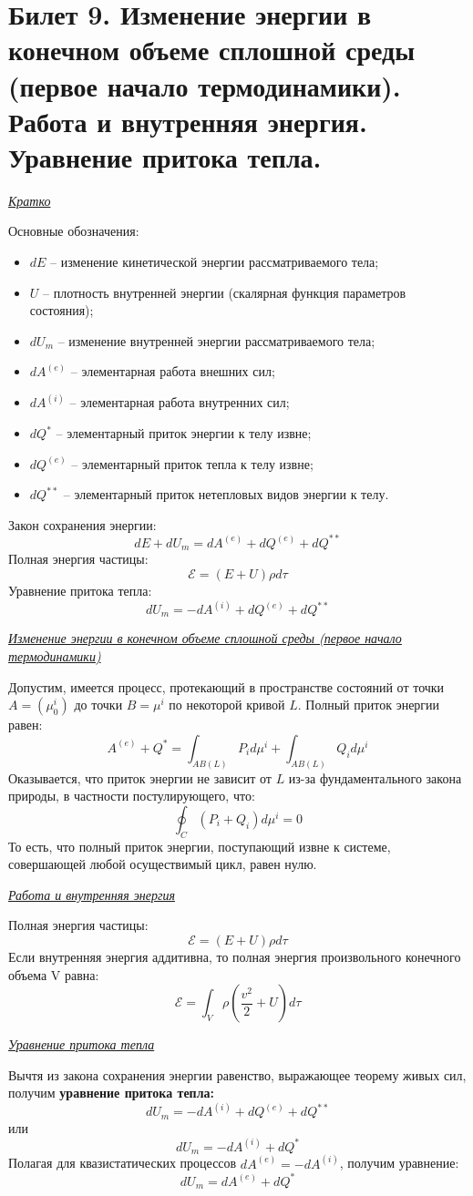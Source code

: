 \newpage
\newpage
\section {Билет 9. Изменение энергии в конечном объеме сплошной среды (первое начало термодинамики). Работа и внутренняя энергия. Уравнение притока тепла.}
\begin{center}
  \textit{\underline{Кратко}}
\end{center}
Основные обозначения:
\begin{itemize}
  \item $dE$ -- изменение кинетической энергии рассматриваемого тела;
  \item $U$ -- плотность внутренней энергии (скалярная функция параметров состояния);
  \item $dU_m$ -- изменение внутренней энергии рассматриваемого тела;
  \item $dA^{(e)}$ -- элементарная работа внешних сил;
  \item $dA^{(i)}$ -- элементарная работа внутренних сил;
  \item $dQ^{*}$ -- элементарный приток энергии к телу извне;
  \item $dQ^{(e)}$ -- элементарный приток тепла к телу извне;
  \item $dQ^{**}$ -- элементарный приток нетепловых видов энергии к телу.
\end{itemize}
Закон сохранения энергии:
$$
  dE + dU_m = dA^{(e)} + dQ^{(e)} + dQ^{**}
$$
Полная энергия частицы:
$$
  \mathcal{E} = (E + U)\rho d\tau
$$
Уравнение притока тепла:
$$
  dU_m = -dA^{(i)} + dQ^{(e)} + dQ^{**}
$$

\begin{center}
  \textit{\underline{Изменение энергии в конечном объеме сплошной среды (первое начало термодинамики)}}
\end{center}
Допустим, имеется процесс, протекающий в пространстве состояний от точки $A = (\mu^i_0)$ до точки $B = \mu^i$ по некоторой кривой $L$. Полный приток энергии равен:
$$
  A^{(e)} + Q^{*} = \int_{AB(L)}P_id\mu^i + \int_{AB(L)}Q_id\mu^i
$$
Оказывается, что приток энергии не зависит от $L$ из-за фундаментального закона природы, в частности постулирующего, что:
$$
  \oint_{C}(P_i + Q_i)d\mu^i = 0
$$
То есть, что полный приток энергии, поступающий извне к системе, совершающей любой осуществимый цикл, равен нулю.
\begin{center}
  \textit{\underline{Работа и внутренняя энергия}}
\end{center}
Полная энергия частицы:
$$
  \mathcal{E} = (E + U)\rho d\tau
$$
Если внутренняя энергия аддитивна, то полная энергия произвольного конечного объема V равна:
$$
  \mathcal{E} = \int_{V}\rho(\frac{v^2}{2} + U)d\tau
$$
\begin{center}
  \textit{\underline{Уравнение притока тепла}}
\end{center}
Вычтя из закона сохранения энергии равенство, выражающее теорему живых сил, получим \textbf{уравнение притока тепла:}
$$
  dU_m = -dA^{(i)} + dQ^{(e)} + dQ^{**}
$$
или
$$
  dU_m = -dA^{(i)} + dQ^{*}
$$
Полагая для квазистатических процессов $dA^{(e)} = -dA^{(i)}$, получим уравнение:
$$
  dU_m = dA^{(e)} + dQ^{*}
$$
